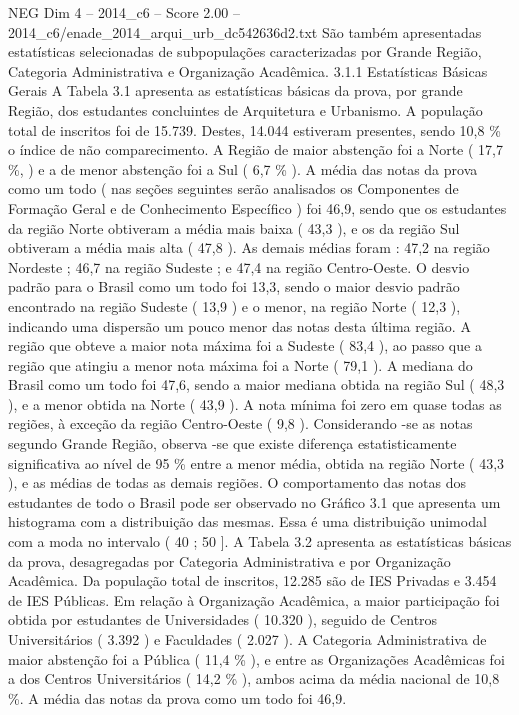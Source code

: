 \begin{textsample}{NEG Dim 4 – 2014\_c6 – Score 2.00 – 2014\_c6/enade\_2014\_arqui\_urb\_dc542636d2.txt}
São também apresentadas estatísticas selecionadas de subpopulações caracterizadas por Grande Região, Categoria Administrativa e Organização Acadêmica. 3.1.1 Estatísticas Básicas Gerais A Tabela 3.1 apresenta as estatísticas básicas da prova, por grande Região, dos estudantes concluintes de Arquitetura e Urbanismo.
A população total de inscritos foi de 15.739.
Destes, 14.044 estiveram presentes, sendo 10,8 \% o índice de não comparecimento.
A Região de maior abstenção foi a Norte ( 17,7 \%, ) e a de menor abstenção foi a Sul ( 6,7 \% ).
A média das notas da prova como um todo ( nas seções seguintes serão analisados os Componentes de Formação Geral e de Conhecimento Específico ) foi 46,9, sendo que os estudantes da região Norte obtiveram a média mais baixa ( 43,3 ), e os da região Sul obtiveram a média mais alta ( 47,8 ).
As demais médias foram : 47,2 na região Nordeste ; 46,7 na região Sudeste ; e 47,4 na região Centro-Oeste.
O desvio padrão para o Brasil como um todo foi 13,3, sendo o maior desvio padrão encontrado na região Sudeste ( 13,9 ) e o menor, na região Norte ( 12,3 ), indicando uma dispersão um pouco menor das notas desta última região.
A região que obteve a maior nota máxima foi a Sudeste ( 83,4 ), ao passo que a região que atingiu a menor nota máxima foi a Norte ( 79,1 ).
A mediana do Brasil como um todo foi 47,6, sendo a maior mediana obtida na região Sul ( 48,3 ), e a menor obtida na Norte ( 43,9 ).
A nota mínima foi zero em quase todas as regiões, à exceção da região Centro-Oeste ( 9,8 ).
Considerando -se as notas segundo Grande Região, observa -se que existe diferença estatisticamente significativa ao nível de 95 \% entre a menor média, obtida na região Norte ( 43,3 ), e as médias de todas as demais regiões.
O comportamento das notas dos estudantes de todo o Brasil pode ser observado no Gráfico 3.1 que apresenta um histograma com a distribuição das mesmas.
Essa é uma distribuição unimodal com a moda no intervalo ( 40 ; 50 ].
A Tabela 3.2 apresenta as estatísticas básicas da prova, desagregadas por Categoria Administrativa e por Organização Acadêmica.
Da população total de inscritos, 12.285 são de IES Privadas e 3.454 de IES Públicas.
Em relação à Organização Acadêmica, a maior participação foi obtida por estudantes de Universidades ( 10.320 ), seguido de Centros Universitários ( 3.392 ) e Faculdades ( 2.027 ).
A Categoria Administrativa de maior abstenção foi a Pública ( 11,4 \% ), e entre as Organizações Acadêmicas foi a dos Centros Universitários ( 14,2 \% ), ambos acima da média nacional de 10,8 \%.
A média das notas da prova como um todo foi 46,9.

\end{textsample}
